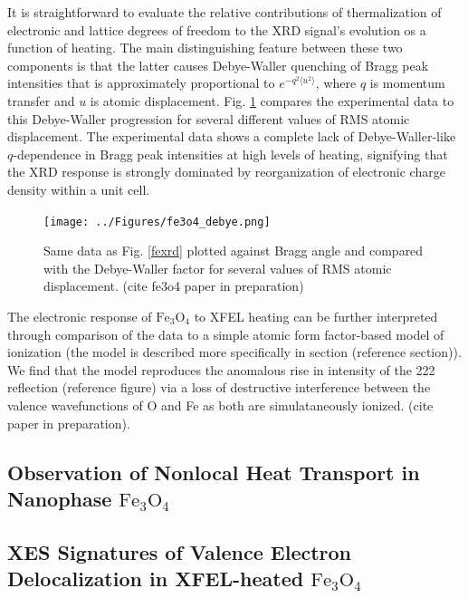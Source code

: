 \documentclass [11pt, proquest, article] {uwthesis}[2016/11/22]
\begin{document}
It is straightforward to evaluate the relative contributions of thermalization of electronic and lattice degrees of freedom to the XRD signal's evolution os a function of heating. The main distinguishing feature between these two components is that the latter causes Debye-Waller quenching of Bragg peak intensities that is approximately proportional to $e^{-q^2\langle u^2 \rangle}$, where $q$ is momentum transfer and $u$ is atomic displacement. Fig. \ref{debye} compares the experimental data to this Debye-Waller progression for several different values of RMS atomic displacement. The experimental data shows a complete lack of Debye-Waller-like $q$-dependence in Bragg peak intensities at high levels of heating, signifying that the XRD response is strongly dominated by reorganization of electronic charge density within a unit cell. 

\begin{figure}[h] 
\caption{Same data as Fig. \ref{fexrd} plotted against Bragg angle and compared with the Debye-Waller factor for several values of RMS atomic displacement. (cite fe3o4 paper in preparation)}
\centering
\texttt{[image: ../Figures/fe3o4\_debye.png]}
\label{debye}

\end{figure}

The electronic response of $\mathrm{Fe}_3\mathrm{O}_4$ to XFEL heating can be further interpreted through comparison of the data to a simple atomic form factor-based model of ionization (the model is described more specifically in section (reference section)). We find that the model reproduces the anomalous rise in intensity of the 222 reflection (reference figure) via a loss of destructive interference between the valence wavefunctions of O and Fe as both are simulataneously ionized. (cite paper in preparation).

\subsection{Observation of Nonlocal Heat Transport in Nanophase $\mathrm{Fe}_3\mathrm{O}_4$}
\subsection{XES Signatures of Valence Electron Delocalization in XFEL-heated $\mathrm{Fe}_3\mathrm{O}_4$}

 
\end{document}
